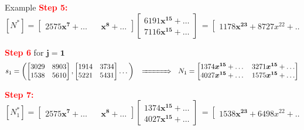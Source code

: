 \documentclass[final]{beamer}
\newlength{\twocolwid}
\begin{document}
\begin{frame}[t]
\begin{columns}[t]
\begin{column}{\twocolwid}
\begin{block}{Example}
		\textcolor{red}{\bf Step 5:}
		$  [N^*] = \begin{bmatrix}
		2575\boldsymbol{x^7}+\dots ~~&~~ \boldsymbol{x^8} + \dots
		\end{bmatrix}
                \begin{bmatrix}
		6191\boldsymbol{x^{15}} + \dots\\
		7116\boldsymbol{x^{15}} + \dots
		\end{bmatrix}\,
=                \begin{bmatrix}
  1178\boldsymbol{x^{23}} + 8727x^{22} + \dots
\end{bmatrix}
		$

		\textcolor{red}{\bf Step 6} for $\boldsymbol{j = 1}$
	$$ s_1 = \left(
		\begin{bmatrix}
		3029& 8903\\
		1538& 5610
		\end{bmatrix},
		\begin{bmatrix}
		1914&3734\\
		5221&5431
		\end{bmatrix}
		\dots
		\right)\,
                ~~\xRightarrow{~~~~~~~~~~}~~
		N_1 = \begin{bmatrix}
		1374\boldsymbol{x^{15}} + \dots & 3271\boldsymbol{x^{15}} + \dots\\
		4027\boldsymbol{x^{15}} + \dots & 1575\boldsymbol{x^{15}} + \dots
		\end{bmatrix}
		$$
	
		\textcolor{red}{\bf Step 7:}
		$  [N_1^*] = \begin{bmatrix}
		2575\boldsymbol{x^7}+\dots ~~&~~ \boldsymbol{x^8} + \dots
		\end{bmatrix}
                \begin{bmatrix}
		1374\boldsymbol{x^{15}} + \dots\\
		4027\boldsymbol{x^{15}} + \dots
		\end{bmatrix}\,
=                \begin{bmatrix}
  1538\boldsymbol{x^{23}} + 6498x^{22} + \dots
\end{bmatrix}
		$

	


\end{block}
\end{column}
\end{columns}
\end{frame}
\end{document}
